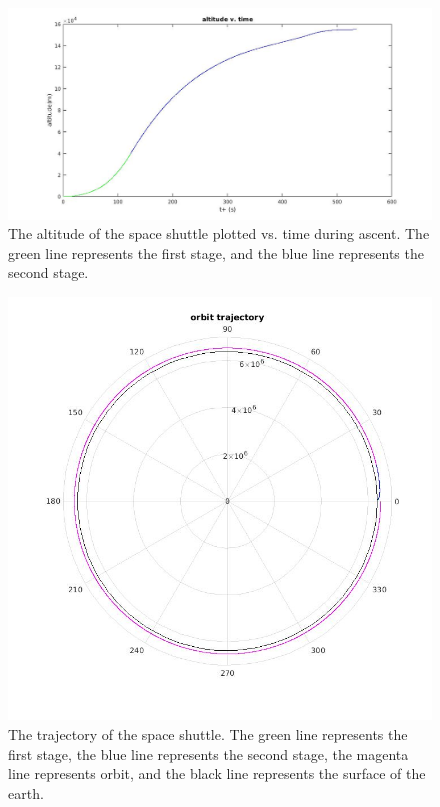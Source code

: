 \documentclass{article}
\begin{document}
\begin{figure}
	\includegraphics[width = \linewidth]{altitude_v_time.jpg}
	\caption{The altitude of the space shuttle plotted vs. time during ascent. The green line represents the first stage,
and the blue line represents the second stage.}
	\label{altitude}
\end{figure}
\begin{figure}
	\includegraphics[width = \linewidth]{orbit_trajectory.jpg}
	\caption{The trajectory of the space shuttle. The green line represents the first stage,
the blue line represents the second stage, the magenta line represents orbit, and the black line represents the surface of the earth.}
	\label{trajectory}
\end{figure}
\end{document}

